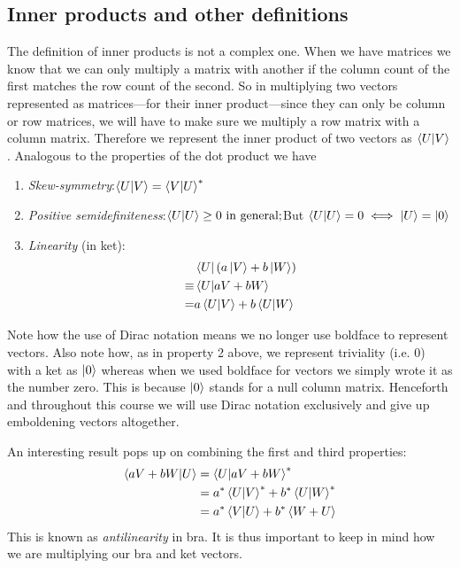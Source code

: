 \documentclass[english,seminar,headertitle]{lecture}
\begin{document}
\subsection{Inner products and other definitions}

The definition of inner products is not a complex one. When we have matrices we know that we can only multiply a matrix with another if the column count of the first matches the row count of the second. So in multiplying two vectors represented as matrices---for their inner product---since they can only be column or row matrices, we will have to make sure we multiply a row matrix with a column matrix. Therefore we represent the inner product of two vectors as $\braket{U | V}$. Analogous to the properties of the dot product we have
\begin{multicols}{2}
\begin{enumerate}
	\item \textit{Skew-symmetry}:\nl$\braket{U | V} = \braket{V | U}^*$
	\item \textit{Positive semidefiniteness}:\nl$\braket{U | U} \ge 0 \textrm{ in general;}$\nl But $\braket{U | U} = 0 \iff \ket{U} = \ket{0}$
	\columnbreak
	\item \textit{Linearity} (in ket):
		\begin{align*}
			&\bra{U} \left(a\ket{V} + b\ket{W}\right) \\ \equiv &\braket{U | aV + bW} \\ = &a\braket{U | V} + b\braket{U | W}
		\end{align*}
\end{enumerate}
\end{multicols}

Note how the use of Dirac notation means we no longer use boldface to represent vectors. Also note how, as in property 2 above, we represent triviality (i.e. 0) with a ket as $\ket{0}$ whereas when we used boldface for vectors we simply wrote it as the number zero. This is because $\ket{0}$ stands for a null column matrix. Henceforth and throughout this course we will use Dirac notation exclusively and give up emboldening vectors altogether.

An interesting result pops up on combining the first and third properties:
\begin{align*}
	\braket{aV + bW | U} &= \braket{U | aV + bW}^* \\
						&= a^* \braket{U | V}^* + b^* \braket{U | W}^* \\
						&= a^* \braket{V | U} + b^* \braket{W + U}
\end{align*}
This is known as \textit{antilinearity} in bra. It is thus important to keep in mind how we are multiplying our bra and ket vectors.\newline
\end{document}
